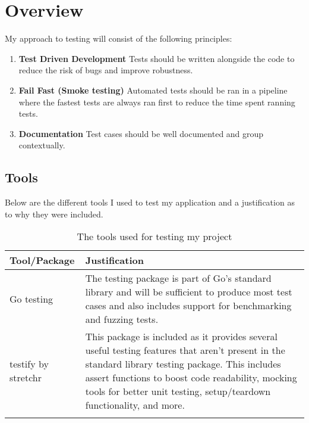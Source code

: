 \section{Overview}

My approach to testing will consist of the following principles:

\begin{enumerate}
  \item \textbf{Test Driven Development} Tests should be written alongside the code to reduce the risk of bugs and improve robustness.
  \item \textbf{Fail Fast (Smoke testing)} Automated tests should be ran in a pipeline where the fastest tests are always ran first to reduce the time spent ranning tests.
  \item \textbf{Documentation} Test cases should be well documented and group contextually.   
\end{enumerate}

\subsection*{Tools}

Below are the different tools I used to test my application and a justification as to why they were included.

\begin{longtable}{ | p{} | p{} | }
  \hline
  \textbf{Tool/Package} & \textbf{Justification}
  \\\hline
  Go testing
  & The testing package is part of Go's standard library and will be sufficient to produce most test cases and also includes support for benchmarking and fuzzing tests.
  \\\hline
  testify by stretchr
  & This package is included as it provides several useful testing features that aren't present in the standard library testing package. This includes assert functions to boost code readability, mocking tools for better unit testing, setup/teardown functionality, and more.
  \\\hline 
  \caption{The tools used for testing my project}
\end{longtable}